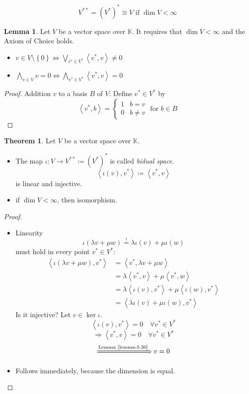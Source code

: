 \documentclass[a4paper,landscape,twocolumn]{article}
\newcommand\set[1]{\left\{#1\right\}}
\newcommand\functional[1]{\left\langle{#1}\right\rangle}
\theoremstyle{definition}
\newtheorem{theorem}{Theorem}
\newtheorem{lemma}{Lemma}
\DeclareMathOperator\kernel{ker} %
\begin{document}
\[ V^{**} = \left(V^*\right)^* \cong V \text{ if } \dim{V} < \infty \]

\begin{lemma}
  \label{lemma-5.30}
  Let $V$ be a vector space over $\mathbb K$. It requires that $\dim{V} < \infty$ and the Axiom of Choice holds.
  \begin{itemize}
    \item $v \in V \setminus \set{0} \Leftrightarrow \bigvee_{v^* \in V^*} \functional{v^*,v} \neq 0$
    \item $\bigwedge_{v \in V} v = 0 \Leftrightarrow \bigwedge_{v^* \in V^*} \functional{v^*,v} = 0$
  \end{itemize}
\end{lemma}
\begin{proof}
  Addition $v$ to a basis $B$ of $V$:
  Define $v^* \in V^*$ by
  \[ \functional{v^*,b} = \begin{cases} 1 & b = v \\ 0 & b \neq v \end{cases} \text{ for } b \in B \]
\end{proof}

\begin{theorem}
  \label{theorem-5.31}
  Let $V$ be a vector space over $\mathbb K$.
  \begin{itemize}
    \item The map $\iota: V \to V^{**} \coloneqq (V^*)^*$ is called \emph{bidual space}.
      \[ \functional{\iota(v), v^*} \coloneqq \functional{v^*,v} \]
      is linear and injective.
    \item if $\dim{V} < \infty$, then isomorphism.
  \end{itemize}
\end{theorem}
\begin{proof}
  \begin{itemize}
    \item Linearity
      \[ \iota(\lambda v + \mu w) \stackrel{!}{=} \lambda \iota(v) + \mu \iota (w) \]
      must hold in every point $v^* \in V^*$:
      \begin{align*}
        \functional{\iota(\lambda v + \mu w), v^*}
          &= \functional{v^*, \lambda v + \mu w} \\
          &= \lambda \functional{v^*,v} + \mu \functional{v^*, w} \\
          &= \lambda \functional{\iota(v), v^*} + \mu \functional{\iota(w), v^*} \\
          &= \functional{\lambda \iota(v) + \mu \iota(w), v^*}
      \end{align*}
      Is it injective?
      Let $v \in \kernel{\iota}$.
      \[ \functional{\iota(v), v^*} = 0 \quad \forall v^* \in V^* \]
      \[ \Rightarrow \functional{v^*,v} = 0 \quad \forall v^* \in V^* \]
      \[ \xRightarrow{\text{Lemma~\ref{lemma-5.30}}} v = 0 \]
    \item Follows immediately, because the dimension is equal.
  \end{itemize}
\end{proof}
\end{document}
